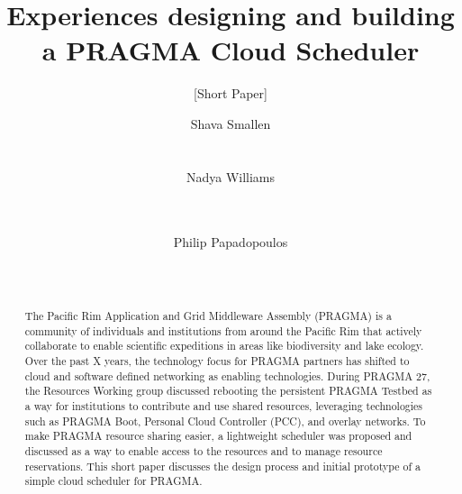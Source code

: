 \documentclass{acm_proc_article-sp}
\begin{document}
\title{Experiences designing and building a PRAGMA Cloud Scheduler}
\subtitle{[Short Paper]}


\author{
\alignauthor
Shava Smallen\\
      \\
      \\
\alignauthor
Nadya Williams\\
      \\
      \\
\and %
\alignauthor Philip Papadopoulos \\
      \\
      \\
}

\maketitle
\begin{abstract}
The Pacific Rim Application and Grid Middleware Assembly (PRAGMA) is a community of individuals and institutions from around the Pacific Rim that actively collaborate to enable scientific expeditions in areas like biodiversity and lake ecology.  Over the past X years, the technology focus for PRAGMA partners has shifted to cloud and software defined networking as enabling technologies.  During PRAGMA 27, the Resources Working group discussed rebooting the persistent PRAGMA Testbed as a way for institutions to contribute and use shared resources, leveraging technologies such as PRAGMA Boot, Personal Cloud Controller (PCC), and overlay networks.  To make PRAGMA resource sharing easier, a lightweight scheduler was proposed and discussed as a way to enable access to the resources and to manage resource reservations.  This short paper discusses the design process and initial prototype of a simple cloud scheduler for PRAGMA.  

\end{abstract}

\end{document}
